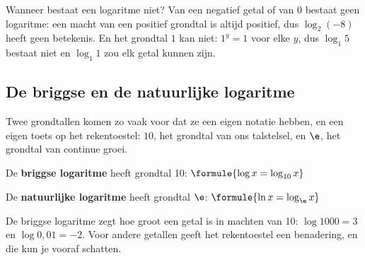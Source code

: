 Wanneer bestaat een logaritme niet? Van een negatief getal of van $0$ bestaat geen logaritme: een macht van een positief grondtal is altijd positief, dus $\log_2(-8)$ heeft geen betekenis. En het grondtal $1$ kan niet: $1^y = 1$ voor elke $y$, dus $\log_1 5$ bestaat niet en $\log_1 1$ zou elk getal kunnen zijn.



\begin{oefeningen}

\end{oefeningen}

\subsection{De briggse en de natuurlijke logaritme}

Twee grondtallen komen zo vaak voor dat ze een eigen notatie hebben, en een eigen toets op het rekentoestel: $10$, het grondtal van ons talstelsel, en $\e$, het grondtal van continue groei.

\begin{theorie}
De \textbf{\textcolor{accent}{briggse logaritme}} heeft grondtal 10: \qquad $\formule{\log x = \log_{10} x}$

De \textbf{\textcolor{accent}{natuurlijke logaritme}} heeft grondtal $\e$: \qquad $\formule{\ln x = \log_{\e} x}$
\end{theorie}

De briggse logaritme zegt hoe groot een getal is in machten van 10: $\log 1000 = 3$ en $\log 0{,}01 = -2$. Voor andere getallen geeft het rekentoestel een benadering, en die kun je vooraf schatten.


